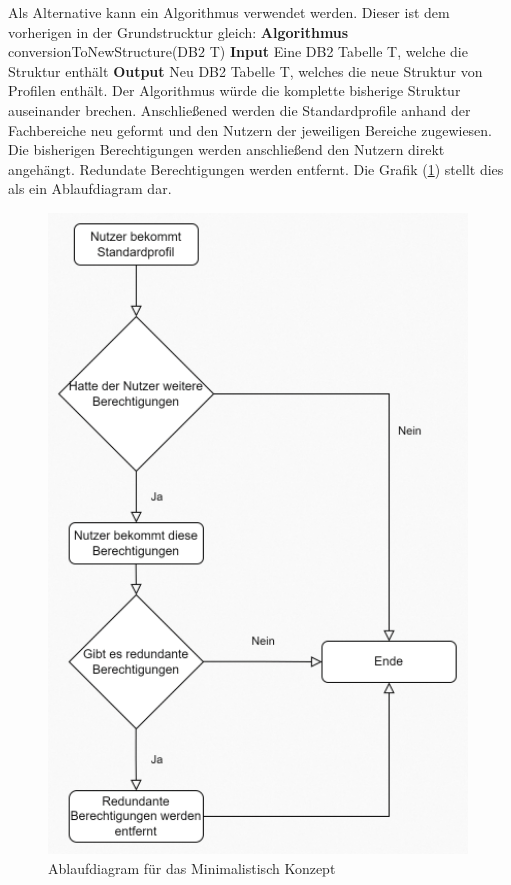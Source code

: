 Als Alternative kann ein Algorithmus verwendet werden.
Dieser ist dem vorherigen in der Grundstrucktur gleich:
\newline
\newline
\textbf{Algorithmus} conversionToNewStructure(DB$2$ T)
\newline
\newline
\textbf{Input} Eine DB2 Tabelle T, welche die Struktur enthält
\newline
\newline
\textbf{Output} Neu DB2 Tabelle T, welches die neue Struktur von Profilen enthält.
\newline
\newline
Der Algorithmus würde die komplette bisherige Struktur auseinander brechen.
Anschließened werden die Standardprofile anhand der Fachbereiche neu geformt und den Nutzern der jeweiligen Bereiche zugewiesen.
Die bisherigen Berechtigungen werden anschließend den Nutzern direkt angehängt.
Redundate Berechtigungen werden entfernt.
Die Grafik (\ref{fig:Mini}) stellt dies als ein Ablaufdiagram dar.
\begin{figure}[h!]
 \centering
 \includegraphics[width=0.99\textwidth]{gfx/Picture/Mini.PNG}
 \caption{Ablaufdiagram für das Minimalistisch Konzept}
 \label{fig:Mini}
\end{figure}